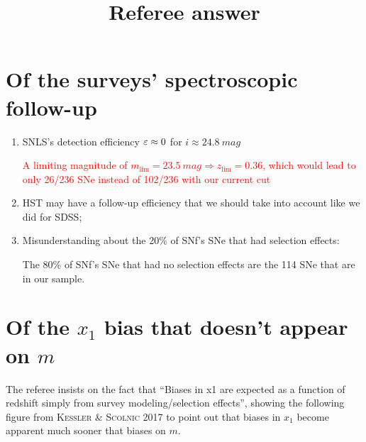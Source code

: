 \documentclass[11pt,a4paper]{paper}
\begin{document}
\title{Referee answer}

\section{Of the surveys' spectroscopic follow-up}
\begin{enumerate}

    \item SNLS's detection efficiency $\varepsilon \approx 0$ for $i \approx
        \SI{24.8}{mag}$\smallbreak

        \textcolor{red}{A limiting magnitude of $m_{\lim} = \SI{23.5}{mag}
        \Rightarrow z_{\lim} = 0.36$, which would lead to only 26/236 SNe
    instead of 102/236 with our current cut}
    
    \item HST may have a follow-up efficiency that we should take into account
        like we did for SDSS;

    \item Misunderstanding about the 20\% of SNf's SNe that had selection
        effects:\smallbreak

        \textcolor{dgreen}{The 80\% of SNf's SNe that had no selection
effects are the 114 SNe that are in our sample}.
\end{enumerate}

\section{Of the $x_1$ bias that doesn't appear on $m$}
The referee insists on the fact that ``Biases in x1 are expected as a function
of redshift simply from survey modeling/selection effects'', showing the
following figure from \textsc{Kessler \& Scolnic 2017} to point
out that biases in $x_1$ become apparent much sooner that biases on $m$.
\end{document}
